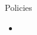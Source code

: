 \documentclass{beamer}
\begin{document}
\begin{frame}{Policies}
    \begin{itemize}
        \item
    \end{itemize}
\end{frame}




\end{document}
